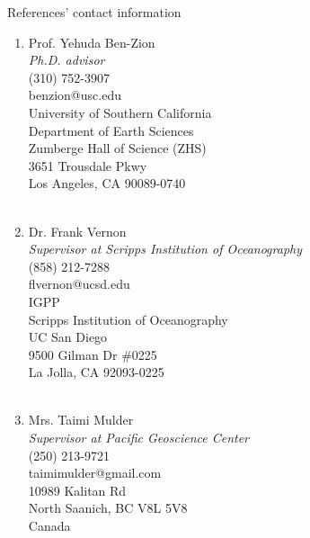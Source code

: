 \begin{rSection}{References' contact information}
	\begin{enumerate}
		\item Prof. Yehuda Ben-Zion\\
		\textit{Ph.D. advisor} \\
		(310) 752-3907 \\
		benzion@usc.edu \\
		University of Southern California\\
		Department of Earth Sciences\\
		Zumberge Hall of Science (ZHS)\\
		3651 Trousdale Pkwy\\
		Los Angeles, CA 90089-0740
		\\
		\\
		\item Dr. Frank Vernon\\
		\textit{Supervisor at Scripps Institution of Oceanography} \\
		(858) 212-7288 \\
		flvernon@ucsd.edu \\
		IGPP\\
		Scripps Institution of Oceanography\\
		UC San Diego\\
		9500 Gilman Dr \#0225\\
		La Jolla, CA 92093-0225
		\\
		\\
		\item Mrs. Taimi Mulder \\
		\textit{Supervisor at Pacific Geoscience Center} \\
		(250) 213-9721 \\
		taimimulder@gmail.com \\
		10989 Kalitan Rd \\
		North Saanich, BC V8L 5V8 \\
		Canada
	\end{enumerate}
\end{rSection}